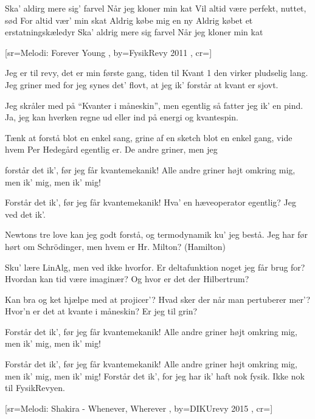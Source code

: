 \documentclass[pdftex,12pt]{article}
\begin{document}
\begin{songs}{}
\endverse
\beginverse
Ska' aldirg mere sig' farvel
Når jeg kloner min kat
Vil altid være perfekt, nuttet, sød
For altid vær' min skat
Aldrig købe mig en ny
Aldrig købet et erstatningskæledyr
Ska' aldrig mere sig farvel
Når jeg kloner min kat

\endverse
\endsong



﻿[sr={Melodi: Forever Young}
,
by={FysikRevy 2011}
,
cr={}]\hypertarget{Forever kvant}{}
\label{song5}

\beginverse
Jeg er til revy, det er min første gang,
tiden til Kvant 1 den virker pludselig lang.
Jeg griner med for jeg synes det' flovt,
at jeg ik' forstår at kvant er sjovt.
\endverse

\beginverse
Jeg skråler med på ``Kvanter i måneskin'',
men egentlig så fatter jeg ik' en pind.
Ja, jeg kan hverken regne ud eller ind
på energi og kvantespin.
\endverse

\beginverse
Tænk at forstå blot en enkel sang,
grine af en sketch blot en enkel gang,
vide hvem Per Hedegård egentlig er.
De andre griner,
men jeg
\endverse

\beginverse
forstår det ik',
før jeg får kvantemekanik!
Alle andre griner højt omkring mig,
men ik' mig,
men ik' mig!
\endverse

\beginverse
Forstår det ik',
før jeg får kvantemekanik!
Hva' en hæveoperator egentlig?
Jeg ved det ik'.
\endverse

\beginverse
Newtons tre love kan jeg godt forstå,
og termodynamik ku' jeg bestå.
Jeg har før hørt om Schrödinger, men
hvem er Hr. Milton? (Hamilton)
\endverse

\beginverse
Sku' lære LinAlg, men ved ikke hvorfor.
Er deltafunktion noget jeg får brug for?
Hvordan kan tid være imaginær?
Og hvor er det der Hilbertrum?
\endverse

\beginverse
Kan bra og ket hjælpe med at projicer'?
Hvad sker der når man pertuberer mer'?
Hvor'n er det at kvante i måneskin?
Er jeg til grin?
\endverse

\beginverse
Forstår det ik',
før jeg får kvantemekanik!
Alle andre griner højt omkring mig,
men ik' mig,
men ik' mig!
\endverse

\beginverse
Forstår det ik',
før jeg får kvantemekanik!
Alle andre griner højt omkring mig,
men ik' mig,
men ik' mig!
Forstår det ik',
for jeg har ik' haft nok fysik.
Ikke nok til FysikRevyen.
\endverse
\endsong



[sr={Melodi: Shakira - Whenever, Wherever}
,
by={DIKUrevy 2015}
,
cr={}]\hypertarget{Afrundingsfejl}{}
\label{song6}


\end{songs}
\end{document}
